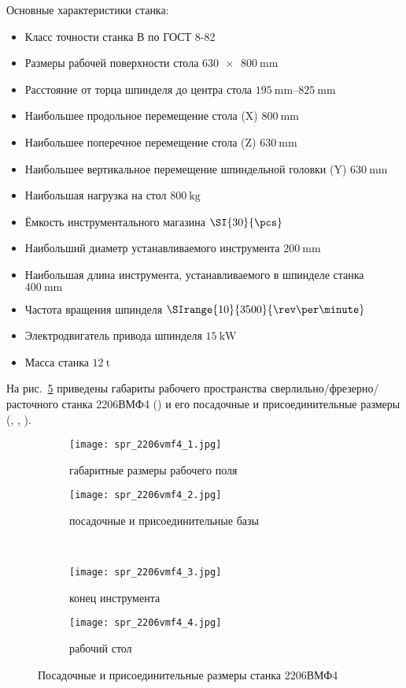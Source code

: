 \documentclass[14pt,russian,a4paper]{extreport}
\begin{document}
Основные характеристики станка:
\begin{itemize}
  \item Класс точности станка В по ГОСТ 8-82
	\item Размеры рабочей поверхности стола $\SI{630 x 800}{\milli\meter}$
  \item Расстояние от торца шпинделя до центра стола $\SIrange{195}{825}{\milli\meter}$
	\item Наибольшее продольное перемещение стола (X) $\SI{800}{\milli\meter}$
	\item Наибольшее поперечное перемещение стола (Z) $\SI{630}{\milli\meter}$
	\item Наибольшее вертикальное перемещение шпиндельной головки (Y) $\SI{630}{\milli\meter}$
	\item Наибольшая нагрузка на стол $\SI{800}{\kilo\gram}$
	\item Ёмкость инструментального магазина $\SI{30}{\pcs}$
	\item Наибольший диаметр устанавливаемого инструмента $\SI{200}{\milli\meter}$
	\item Наибольшая длина инструмента, устанавливаемого в шпинделе станка $\SI{400}{\milli\meter}$
	\item Частота вращения шпинделя $\SIrange{10}{3500}{\rev\per\minute}$
	\item Электродвигатель привода шпинделя $\SI{15}{\kilo\watt}$
	\item Масса станка $\SI{12}{\tonne}$
\end{itemize}

\newpage
На рис.~\ref{fig:2206} приведены габариты рабочего пространства сверлильно\-/фрезерно\-/расточного станка 2206ВМФ4 () и его посадочные и присоединительные размеры (, , ).

\begin{figure}[H]
	\centering
  \begin{subfigure}[b]{.50\textwidth}
    \centering
    \texttt{[image: spr\_2206vmf4\_1.jpg]}
    \caption{габаритные размеры рабочего поля}
    \label{subfig:2206a}
  \end{subfigure}%
  \begin{subfigure}[b]{.50\textwidth}
    \centering
    \texttt{[image: spr\_2206vmf4\_2.jpg]}
    \caption{посадочные и присоединительные базы}
    \label{subfig:2206b}
  \end{subfigure} \\
  \begin{subfigure}[b]{.50\textwidth}
    \centering
    \texttt{[image: spr\_2206vmf4\_3.jpg]}
    \caption{конец инструмента}
    \label{subfig:2206c}
  \end{subfigure}%
  \begin{subfigure}[b]{.50\textwidth}
    \centering
    \texttt{[image: spr\_2206vmf4\_4.jpg]}
    \caption{рабочий стол}
    \label{subfig:2206d}
  \end{subfigure}%
  \caption{Посадочные и присоединительные размеры станка 2206ВМФ4}
  \label{fig:2206}
\end{figure}
\end{document}
